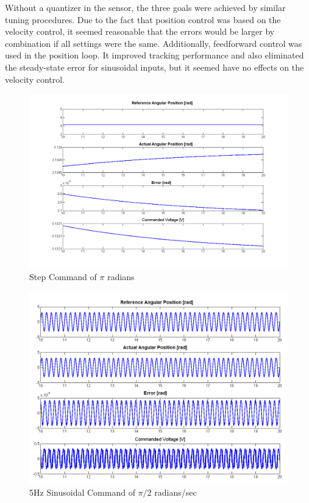 \documentclass{article}
\theoremstyle{plain}
\theoremstyle{definition}
\theoremstyle{remark}
\begin{document}
Without a quantizer in the sensor, the three goals were achieved by similar tuning procedures. Due to the fact that position control was based on the velocity control, it seemed reasonable that the errors would be larger by combination if all settings were the same. Additionally, feedforward control was used in the position loop. It improved tracking performance and also eliminated the steady-state error for sinusoidal inputs, but it seemed have no effects on the velocity control.  

\begin{figure}[htb]
\begin{center}
\includegraphics[width = 13 cm]{q3_18}
\caption{Step Command of $\pi$ radians}
\label{q3_18}
\end{center}
\end{figure}

\begin{figure}[htb]
\begin{center}
\includegraphics[width = 13 cm]{q3_19}
\caption{5Hz Sinusoidal Command of $\pi/2$ radians/sec}
\label{q3_19}
\end{center}
\end{figure}
\end{document}
